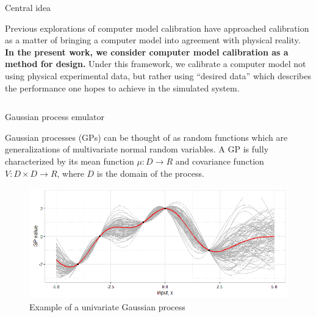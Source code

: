\documentclass[final]{beamer}
\newlength{\onecolwid}
\newlength{\twocolwid}
\begin{document}
\begin{frame}[t]
\begin{columns}[t]
\begin{column}{\twocolwid}
\begin{alertblock}{Central idea}

Previous explorations of computer model calibration have approached calibration as a matter of bringing a computer model into agreement with physical reality\cite{Bayarri2007,Kennedy2001,Higdon2004,Williams2006}. \textbf{In the present work, we consider computer model calibration as a method for design.} Under this framework, we calibrate a computer model not using physical experimental data, but rather using ``desired data'' which describes the performance one hopes to achieve in the simulated system. 

\end{alertblock} 


\begin{columns}[t,totalwidth=\twocolwid] %

\begin{column}{\onecolwid}\vspace{-.6in} %


\begin{alertblock}{Gaussian process emulator}

Gaussian processes (GPs) can be thought of as random functions which are generalizations of multivariate normal random variables\cite{OHagan1978}. A GP is fully characterized by its mean function $\mu:D\to R$ and covariance function $V:D\times D\to R$, where $D$ is the domain of the process.

\begin{figure}[h!]
\includegraphics[width=0.95\linewidth]{../../gp_example}
\caption{Example of a univariate Gaussian process}
\label{gp_ex}
\end{figure}




\end{alertblock}
\end{column}
\end{columns}
\end{column}
\end{columns}
\end{frame}
\end{document}
